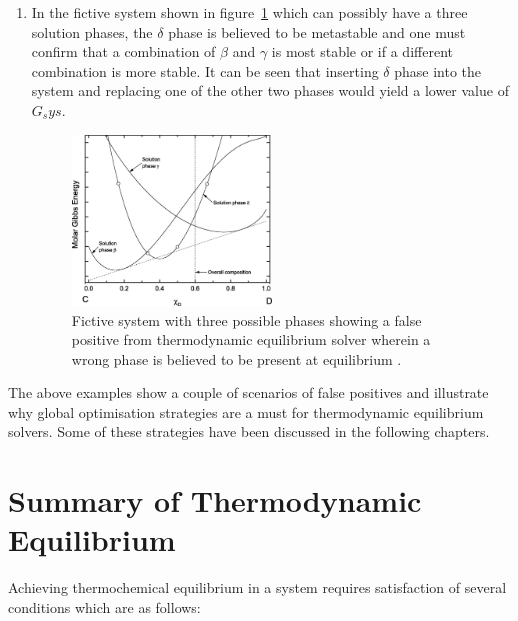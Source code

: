 \begin{enumerate}
	\item In the fictive system shown in figure~\ref{fig:go2} which can possibly have a three solution phases, the $\delta$ phase is  believed to be metastable and one must confirm that a combination of $\beta$ and $\gamma$ is most stable or if a different combination is more stable. It can be seen that inserting $\delta$ phase into the system and replacing one of the other two phases would yield a lower value of $G_sys$.
		\begin{figure}[htbp]
		\centering
		\includegraphics[width=0.5\textwidth]{figures/Global_opt2}
		\caption{Fictive system with three possible phases showing a false positive from thermodynamic equilibrium solver wherein a wrong phase is believed to be present at equilibrium \cite{Piro16}.}
		\label{fig:go2}
	\end{figure}		
	\end{enumerate}

The above examples show a couple of scenarios of false positives and illustrate why global optimisation strategies are a must for thermodynamic equilibrium solvers. Some of these strategies have been discussed in the following chapters.

\section{Summary of Thermodynamic Equilibrium}
Achieving thermochemical equilibrium in a system requires satisfaction of several conditions which are as follows:
